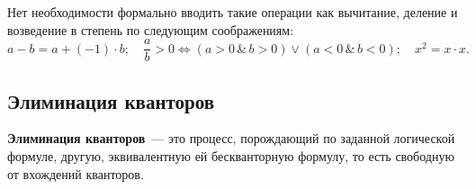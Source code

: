     Нет необходимости формально вводить такие операции как вычитание, деление и возведение в степень по следующим соображениям:
    \begin{equation*}
        a-b=a+(-1)\cdot b; \quad \frac{a}{b} > 0 \Leftrightarrow (a > 0 \, \& \, b > 0) \lor (a < 0 \, \& \, b < 0); \quad x^2 = x \cdot x.
    \end{equation*}

\subsection{Элиминация кванторов}

\begin{definition}
    \textbf{Элиминация кванторов}~--- это процесс, порождающий по заданной логической формуле, другую, эквивалентную ей бескванторную формулу, то есть свободную от вхождений кванторов.
\end{definition}

